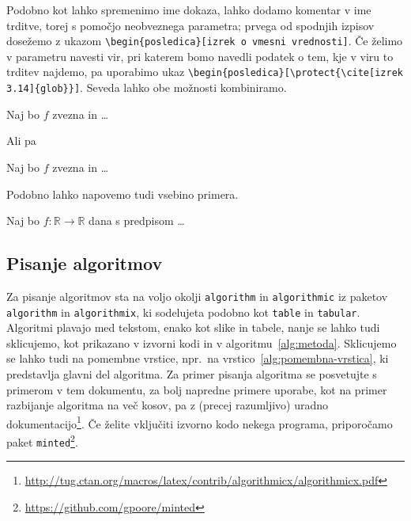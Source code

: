 \documentclass[mat1]{fmfdelo}
\newcommand{\R}{\mathbb R}
\begin{document}
Podobno kot lahko spremenimo ime dokaza, lahko dodamo komentar v ime trditve,
torej s pomočjo neobveznega parametra; prvega od spodnjih izpisov dosežemo z
ukazom \verb|\begin{posledica}[izrek o vmesni vrednosti]|. Če želimo v
parametru navesti vir, pri katerem bomo navedli podatek o tem, kje v viru to
trditev najdemo, pa uporabimo ukaz
\verb|\begin{posledica}[\protect{\cite[izrek 3.14]{glob}}]|. Seveda lahko obe
možnosti kombiniramo.


\begin{posledica}
  Naj bo $f$ zvezna in \ldots
\end{posledica}

Ali pa

\begin{posledica}
  Naj bo $f$ zvezna in \ldots
\end{posledica}

Podobno lahko napovemo tudi vsebino primera.

\begin{primer}
  Naj bo $f \colon \R \to \R$ dana s predpisom \dots
\end{primer}

\subsection{Pisanje algoritmov}
Za pisanje algoritmov sta na voljo okolji \texttt{algorithm} in
\texttt{algorithmic} iz paketov \texttt{algorithm} in \texttt{algorithmix}, ki
sodelujeta podobno kot \texttt{table} in \texttt{tabular}. Algoritmi plavajo
med tekstom, enako kot slike in tabele, nanje se lahko tudi sklicujemo, kot
prikazano v izvorni kodi in v algoritmu~\ref{alg:metoda}. Sklicujemo se lahko
tudi na pomembne vrstice, npr.\ na vrstico~\ref{alg:pomembna-vrstica}, ki
predstavlja glavni del algoritma. Za primer pisanja algoritma se posvetujte s
primerom v tem dokumentu, za bolj napredne primere uporabe, kot na primer
razbijanje algoritma na več kosov, pa z (precej razumljivo) uradno
dokumentacijo\footnote{\url{http://tug.ctan.org/macros/latex/contrib/algorithmicx/algorithmicx.pdf}}.
Če želite vključiti izvorno kodo nekega programa, priporočamo paket
\texttt{minted}\footnote{\url{https://github.com/gpoore/minted}}.
\end{document}
